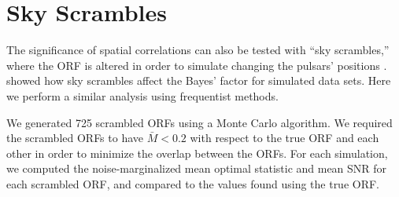 \documentclass[twocolumn,aps,prd,superscriptaddress]{revtex4-1}
\begin{document}
\section{Sky Scrambles}
\label{sec:skyscrambles}

The significance of spatial correlations can also be tested with ``sky scrambles,'' 
where the ORF is altered in order to simulate changing the pulsars' positions \citep{cs2016}. 
\citet{tlb+2017} showed how sky scrambles affect the Bayes' factor for simulated data sets. 
Here we perform a similar analysis using frequentist methods.

We generated 725 scrambled ORFs 
using a Monte Carlo algorithm. 
We required the scrambled ORFs to have $\bar{M} < 0.2$ 
with respect to the true ORF and each other 
in order to minimize the overlap between the ORFs. 
For each simulation, 
we computed the noise-marginalized mean optimal statistic and mean SNR 
for each scrambled ORF, and compared to the values found using the true ORF.
\end{document}
